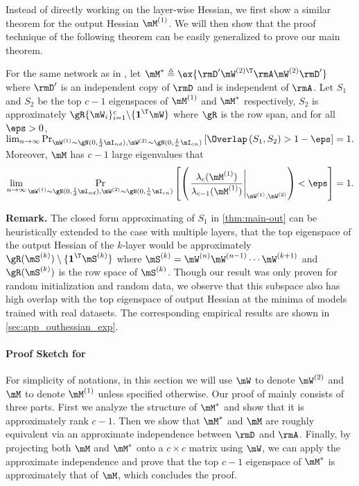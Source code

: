 Instead of directly working on the layer-wise Hessian, we first show a similar theorem for the output Hessian $\mM^{(1)}$. We will then show that the proof technique of the following theorem can be easily generalized to prove our main theorem.

\begin{theorem}
\label{thm:main-out}
For the same network as in , let $\mM^*\triangleq \ex{\rmD'\mW^{(2)\T}\rmA\mW^{(2)}\rmD'}$ where $\rmD'$ is an independent copy of $\rmD$ and is independent of $\rmA$. Let $S_1$ and $S_2$ be the top $c-1$ eigenspaces of $\mM^{(1)}$ and $\mM^*$ respectively, $S_2$ is approximately $\gR\{\mW_i\}_{i=1}^c\backslash\{\textbf{1}^\T\mW\}$ where $\gR$ is the row span, and for all $\eps>0$,
$\lim_{n\to\infty}\mathop{\Pr}_{\mW^{(1)}\sim\gN(0,\frac{1}{d}\mI_{nd}), \mW^{(2)}\sim\gN(0,\frac{1}{n}\mI_{cn})}\left[\Overlap\left(S_1,S_2\right)>1-\eps\right] = 1.$
Moreover, $\mM$ has $c-1$ large eigenvalues that \begin{equation}
    \lim_{n\to\infty}\mathop{\Pr}_{\mW^{(1)}\sim\gN(0,\frac{1}{d}\mI_{nd}), \mW^{(2)}\sim\gN(0,\frac{1}{n}\mI_{cn})}\left[\left(\left.\frac{\lambda_c(\mM^{(1)})}{\lambda_{c-1}(\mM^{(1)})}\right|_{\mW^{(1)}, \mW^{(2)}}\right) < \eps\right] = 1.
\end{equation}
\end{theorem}

\textbf{Remark.}
The closed form approximating of $S_1$ in \cref{thm:main-out} can be heuristically extended to the case with multiple layers, that the top eigenspace of the output Hessian of the $k$-layer would be approximately $\gR(\mS^{(k)})\setminus\{\textbf{1}^\T\mS^{(k)}\}$
where $\mS^{(k)} = \mW^{(n)}\mW^{(n-1)}\cdots\mW^{(k+1)}$ and $\gR(\mS^{(k)})$ is the row space of $\mS^{(k)}$.
Though our result was only proven for random initialization and random data, we observe that this subspace also has high overlap with the top eigenspace of output Hessian at the minima of models trained with real datasets. The corresponding empirical results are shown in \cref{sec:app_outhessian_exp}. 

\paragraph{Proof Sketch for }
For simplicity of notations, in this section we will use $\mW$ to denote $\mW^{(2)}$ and $\mM$ to denote $\mM^{(1)}$ unless specified otherwise.
Our proof of  mainly consists of three parts. First we analyze the structure of $\mM^*$ and show that it is approximately rank $c-1$. Then we show that $\mM^*$ and $\mM$ are roughly equivalent via an approximate independence between $\rmD$ and $\rmA$. Finally, by projecting both $\mM$ and $\mM^*$ onto a $c\times c$ matrix using $\mW$, we can apply the approximate independence and prove that the top $c-1$ eigenspace of $\mM^*$ is approximately that of $\mM$, which concludes the proof.

